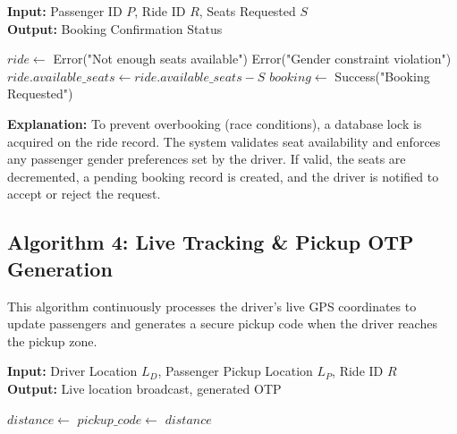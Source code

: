 \begin{algorithm}[H]
\caption{Ride Booking and Seat Locking}
\textbf{Input:} Passenger ID $P$, Ride ID $R$, Seats Requested $S$ \\
\textbf{Output:} Booking Confirmation Status
\begin{algorithmic}[1]
    \State {}
    \State $ride \gets$  
        \State \Return Error("Not enough seats available")
    \EndIf
        \State \Return Error("Gender constraint violation")
    \EndIf
    \State $ride.available\_seats \gets ride.available\_seats - S$
    \State $booking \gets$ 
    \State {}
    \State {}
    \State {}
    \State \Return Success("Booking Requested")
\EndFunction
\end{algorithmic}
\end{algorithm}

\textbf{Explanation:} To prevent overbooking (race conditions), a database lock is acquired on the ride record. The system validates seat availability and enforces any passenger gender preferences set by the driver. If valid, the seats are decremented, a pending booking record is created, and the driver is notified to accept or reject the request.

\subsection{Algorithm 4: Live Tracking \& Pickup OTP Generation}

This algorithm continuously processes the driver's live GPS coordinates to update passengers and generates a secure pickup code when the driver reaches the pickup zone.

\begin{algorithm}[H]
\small
\caption{Live Tracking and Geofenced OTP}
\textbf{Input:} Driver Location $L_D$, Passenger Pickup Location $L_P$, Ride ID $R$ \\
\textbf{Output:} Live location broadcast, generated OTP
\begin{algorithmic}[1]
    \State {}
    \State $distance \gets$ 
            \State $pickup\_code \gets$ 
            \State {}
            \State {}
        \EndIf
    \EndIf
    \State \Return $distance$
\EndFunction
\end{algorithmic}
\end{algorithm}


